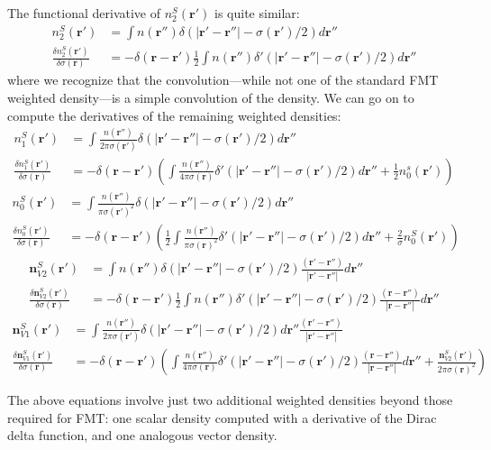 \documentclass[letterpaper,twocolumn,amsmath,amssymb,jcp,10pt,aip]{revtex4-1}
\newcommand{\rr}{\textbf{r}}
\begin{document}
\begin{widetext}
The functional derivative of $n_2^S(\rr')$ is quite similar:
\begin{align}
  n_2^{S}(\rr') &= \int n(\rr'') \delta(|\rr' - \rr''| - \sigma(\rr')/2)d\mathbf
  r''\\
  \frac{\delta n_2^{S}(\rr')}{\delta \sigma(\rr)} &= -\delta(\rr-\rr') \frac 12 \int n(\rr'')
  \delta'(|\rr'-\rr''| - \sigma(\rr')/2) d\rr''
\end{align}
where we recognize that the convolution---while not one of the standard
FMT weighted density---is a simple convolution of the density.  We can
go on to compute the derivatives of the remaining weighted densities:
\begin{align}
  n_1^{S}(\rr') &= \int \frac{n(\rr'')}{2\pi \sigma(\rr')} \delta(|\rr' - \rr''| - \sigma(\rr')/2)d\mathbf r''\\
    \frac{\delta n_1^{S}(\rr')}{\delta \sigma(\rr)} &=
    -\delta(\rr-\rr') \left( \int \frac{n(\rr'')}{4\pi \sigma(\rr)}
    \delta'(|\rr'-\rr''| - \sigma(\rr')/2) d\rr''
    + \frac 12 n_0^s(\rr') \right)
\end{align}
\begin{align}
  n_0^{S}(\rr') &= \int \frac{n(\rr'')}{\pi \sigma(\rr')^2} \delta(|\rr' - \rr''| - \sigma(\rr')/2)d\mathbf r''\\
    \frac{\delta n_0^{S}(\rr')}{\delta \sigma(\rr)}
    &= -\delta(\rr-\rr') \left( \frac 12 \int \frac{n(\rr'')}{\pi \sigma(\rr)^2}
    \delta'(|\rr'-\rr''| - \sigma(\rr')/2) d\rr''
    +
    \frac{2}{\sigma} n_0^S(\rr') \right)
\end{align}
\begin{align}
  \mathbf{n}_{V2}^{S}(\rr') &= \int n(\rr'') \delta(|\rr' - \rr''| - \sigma(\rr')/2)
  \frac{(\rr' - \rr'')}{|\rr' - \rr''|} d \rr''\\
  \frac{\delta \mathbf{n}_{V2}^{S}(\rr')}{\delta \sigma(\rr)} &= -\delta(\rr - \rr')
  \frac 12 \int n(\rr'') \delta'(|\rr' - \rr''| - \sigma(\rr')/2)
  \frac{(\rr - \rr'')}{|\rr - \rr''|} d\rr''
\end{align}
\begin{align}
 \mathbf{n}_{V1}^{S}(\rr') &= \int \frac{n(\rr'')}{2\pi \sigma(\rr')} \delta(|\rr' - \rr''| - \sigma(\rr')/2)d\mathbf r''
   \frac{(\rr' - \rr'')}{|\rr' - \rr''|}\\
 \frac{\delta \mathbf{n}_{V1}^{S}(\rr')}{\delta \sigma(\rr)}
 &= -\delta(\rr-\rr')\left(\int \frac{n(\rr'')}{4\pi \sigma(\rr)}
   \delta'(|\rr'-\rr''| - \sigma(\rr')/2) \frac{(\rr - \rr'')}{|\rr - \rr''|}  d\rr''
   + \frac{\mathbf{n}_{V2}^S(\rr')}{2 \pi \sigma(\rr)^2} \right)
\end{align}

The above equations involve just two additional weighted densities
beyond those required for FMT: one scalar density computed with a
derivative of the Dirac delta function, and one analogous vector
density.

\end{widetext}

\end{document}
